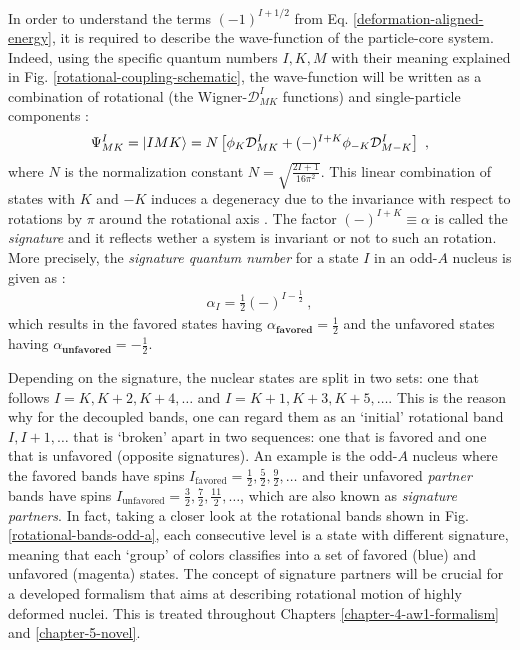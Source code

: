 In order to understand the terms $(-1)^{I+1/2}$ from Eq. \eqref{deformation-aligned-energy}, it is required to describe the wave-function of the particle-core system. Indeed, using the specific quantum numbers $I,K,M$ with their meaning explained in Fig. \ref{rotational-coupling-schematic}, the wave-function will be written as a combination of rotational (the Wigner-$\mathcal{D}_{MK}^I$ functions) and single-particle components \cite{wang2007exotic,davydov1958rotational}:
\begin{align}
    \Psi_{MK}^I=\ket{IMK}=N\left[\phi_K \mathcal{D}_{MK}^I+(-)^{I+K}\phi_{-K}\mathcal{D}_{M-K}^I\right]\ ,
    \label{RAL-bands-wave-function}
\end{align}
where $N$ is the normalization constant $N=\sqrt{\frac{2I+1}{16\pi^2}}$. This linear combination of states with $K$ and $-K$ induces a degeneracy due to the invariance with respect to rotations by $\pi$ around the rotational axis \cite{frauendorf1997tilted,bohr1998nuclear}. The factor $(-)^{I+K}\equiv\alpha$ is called the \emph{signature} and it reflects wether a system is invariant or not to such an rotation. More precisely, the \emph{signature quantum number} for a state $I$ in an odd-$A$ nucleus is given as \cite{sun1994varied}:
\begin{align}
    \alpha_I=\frac{1}{2}(-)^{I-\frac{1}{2}}\ ,
    \label{signature-quantum-number}
\end{align}
which results in the favored states having $\alpha_\textbf{favored}=\frac{1}{2}$ and the unfavored states having $\alpha_\textbf{unfavored}=-\frac{1}{2}$.

Depending on the signature, the nuclear states are split in two sets: one that follows $I=K,K+2,K+4,\dots$ and $I=K+1,K+3,K+5,\dots$. This is the reason why for the decoupled bands, one can regard them as an `initial' rotational band $I,I+1,\dots$ that is `broken' apart in two sequences: one that is favored and one that is unfavored (opposite signatures). An example is the odd-$A$ nucleus where the favored bands have spins $I_\text{favored}=\frac{1}{2},\frac{5}{2},\frac{9}{2},\dots$ and their unfavored \emph{partner} bands have spins $I_\text{unfavored}=\frac{3}{2},\frac{7}{2},\frac{11}{2},\dots$, which are also known as \emph{signature partners}. In fact, taking a closer look at the rotational bands shown in Fig. \ref{rotational-bands-odd-a}, each consecutive level is a state with different signature, meaning that each `group' of colors classifies into a set of favored (blue) and unfavored (magenta) states. The concept of signature partners will be crucial for a developed formalism that aims at describing rotational motion of highly deformed nuclei. This is treated throughout Chapters \ref{chapter-4-aw1-formalism} and \ref{chapter-5-novel}.

